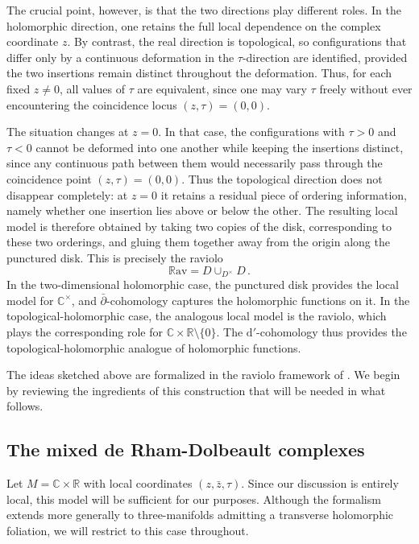 \documentclass[11pt]{amsart}
\newcommand{\R}{{\mathbb R}}
\newcommand{\C}{{\mathbb C}}
\numberwithin{equation}{section}
\numberwithin{figure}{section}
\numberwithin{table}{section}
\renewcommand{\d}{\mathrm{d}}
\theoremstyle{thm}
\numberwithin{equation}{subsection}
\theoremstyle{definition}
\theoremstyle{rem}
\begin{document}
The crucial point, however, is that the two directions play different roles. In the holomorphic direction, one retains the full local dependence on the complex coordinate \(z\). By contrast, the real direction is topological, so configurations that differ only by a continuous deformation in the \(\tau\)-direction are identified, provided the two insertions remain distinct throughout the deformation. Thus, for each fixed \(z\neq 0\), all values of \(\tau\) are equivalent, since one may vary \(\tau\) freely without ever encountering the coincidence locus \((z,\tau)=(0,0)\).

The situation changes at \(z=0\). In that case, the configurations with \(\tau>0\) and \(\tau<0\) cannot be deformed into one another while keeping the insertions distinct, since any continuous path between them would necessarily pass through the coincidence point \((z,\tau)=(0,0)\). Thus the topological direction does not disappear completely: at \(z=0\) it retains a residual piece of ordering information, namely whether one insertion lies above or below the other. The resulting local model is therefore obtained by taking two copies of the disk, corresponding to these two orderings, and gluing them together away from the origin along the punctured disk. This is precisely the raviolo
\begin{equation}
    \mathbb{R}\mathrm{av} = D\cup_{D^\times}D\,.
\end{equation}
In the two-dimensional holomorphic case, the punctured disk provides the local model for \(\mathbb{C}^\times\), and \(\bar\partial\)-cohomology captures the holomorphic functions on it. In the topological-holomorphic case, the analogous local model is the raviolo, which plays the corresponding role for \(\mathbb{C}\times\mathbb{R}\setminus\{0\}\). The $\d'$-cohomology thus provides the topological-holomorphic analogue of holomorphic functions. 

The ideas sketched above are formalized in the raviolo framework of \cite{Garner:2023zqn}. We begin by reviewing the ingredients of this construction that will be needed in what follows.



\subsection{The mixed de Rham-Dolbeault complexes}
Let $M=\C\times \R$
with local coordinates 
$(z, \bar z, \tau)$. Since our discussion is entirely local, this model will be sufficient for our purposes. Although the formalism extends more generally to three-manifolds admitting a transverse holomorphic foliation, we will restrict to this case throughout.
\end{document}
